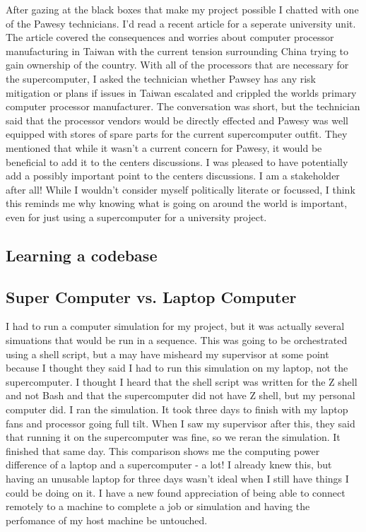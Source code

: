 \documentclass[11pt]{article}
\begin{document}
After gazing at the black boxes that make my project possible I chatted with one of the Pawesy technicians. I'd read a recent article for a seperate university unit. The article covered the consequences and worries about computer processor manufacturing in Taiwan with the current tension surrounding China trying to gain ownership of the country. With all of the processors that are necessary for the supercomputer, I asked the technician whether Pawsey has any risk mitigation or plans if issues in Taiwan escalated and crippled the worlds primary computer processor manufacturer. The conversation was short, but the technician said that the processor vendors would be directly effected and Pawesy was well equipped with stores of spare parts for the current supercomputer outfit. They mentioned that while it wasn't a current concern for Pawesy, it would be beneficial to add it to the centers discussions. I was pleased to have potentially add a possibly important point to the centers discussions. I am a stakeholder after all! While I wouldn't consider myself politically literate or focussed, I think this reminds me why knowing what is going on around the world is important, even for just using a supercomputer for a university project.

\subsection{Learning a codebase}
\subsection{Super Computer vs. Laptop Computer}

I had to run a computer simulation for my project, but it was actually several simuations that would be run in a sequence. This was going to be orchestrated using a shell script, but a may have misheard my supervisor at some point because I thought they said I had to run this simulation on my laptop, not the supercomputer. I thought I heard that the shell script was written for the Z shell and not Bash and that the supercomputer did not have Z shell, but my personal computer did. I ran the simulation. It took three days to finish with my laptop fans and processor going full tilt. When I saw my supervisor after this, they said that running it on the supercomputer was fine, so we reran the simulation. It finished that same day. This comparison shows me the computing power difference of a laptop and a supercomputer - a lot! I already knew this, but having an unusable laptop for three days wasn't ideal when I still have things I could be doing on it. I have a new found appreciation of being able to connect remotely to a machine to complete a job or simulation and having the perfomance of my host machine be untouched.
\end{document}
